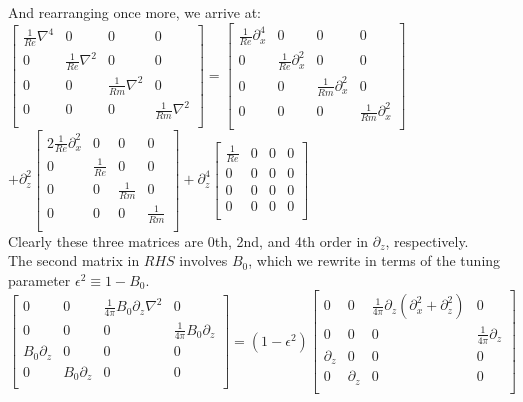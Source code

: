 \documentclass[letterpaper,12pt]{article}
\newcommand\reye{\mathrel{Re}}
\newcommand\reym{\mathrel{Rm}}
\begin{document}
And rearranging once more, we arrive at: \\

$\left[\begin{matrix}
\frac{1}{\reye} \nabla^4 & 0 & 0 & 0 \\
0 & \frac{1}{\reye}\nabla^2 & 0 & 0 \\
0 & 0 & \frac{1}{\reym}\nabla^2 & 0 \\
0 & 0 & 0 & \frac{1}{\reym}\nabla^2 \\ 
\end{matrix}\right] = \left[\begin{matrix}
\frac{1}{\reye}\partial_x^4 & 0 & 0 & 0 \\
0 & \frac{1}{\reye}\partial_x^2 & 0 &0 \\
0 & 0 & \frac{1}{\reym}\partial_x^2 & 0 \\
0 & 0 & 0 & \frac{1}{\reym}\partial_x^2 \\ \end{matrix}\right] $ \\

$+ \partial_z^2 \left[\begin{matrix}
2\frac{1}{\reye} \partial_x^2 & 0 & 0 & 0 \\
0 & \frac{1}{\reye} & 0 & 0 \\
0 & 0 & \frac{1}{\reym} & 0 \\
0 & 0 & 0 & \frac{1}{\reym} \\ \end{matrix}\right] + \partial_z^4 \left[\begin{matrix}
\frac{1}{\reye} & 0 & 0 & 0 \\
0 & 0 & 0 & 0 \\
0 & 0 & 0 & 0 \\
0 & 0 & 0 & 0 \\ \end{matrix}\right] $ \\

Clearly these three matrices are 0th, 2nd, and 4th order in $\partial_z$, respectively. \\

The second matrix in $RHS$ involves $B_0$, which we rewrite in terms of the tuning parameter $\epsilon^2 \equiv 1 - B_0$. \\

$\left[\begin{matrix}
0 & 0 & \frac{1}{4\pi}B_0 \partial_z \nabla^2 & 0 \\
0 & 0 & 0 & \frac{1}{4\pi} B_0 \partial_z \\
B_0 \partial_z & 0 & 0 & 0 \\
0 & B_0 \partial_z & 0 & 0 \\ \end{matrix}\right] = (1 - \epsilon^2) \left[\begin{matrix}
0 & 0 & \frac{1}{4\pi}\partial_z(\partial_x^2 + \partial_z^2) & 0 \\
0 & 0 & 0 & \frac{1}{4\pi}\partial_z \\
\partial_z & 0 & 0 & 0 \\
0 & \partial_z & 0 & 0 \\ \end{matrix}\right] $ \\
\end{document}
